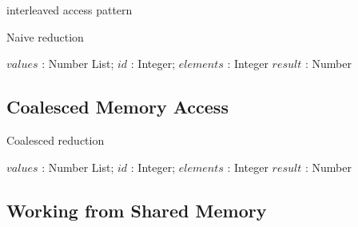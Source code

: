 interleaved access pattern


\begin{algorithm}
  \caption{Naive reduction}
  \label{alg:naiveReduct}
  \begin{algorithmic}
              {$values$ : Number List; $id$ : Integer; $elements$ : Integer}
              {$result$ : Number}
              {
                  \ENDIF
                  \SYNC
                \ENDWHILE
                \ENDIF
              }
  \end{algorithmic}
\end{algorithm}


\subsection{Coalesced Memory Access}

\begin{algorithm}
  \caption{Coalesced reduction}
  \label{alg:coalescedReduct}
  \begin{algorithmic}
              {$values$ : Number List; $id$ : Integer; $elements$ : Integer}
              {$result$ : Number}
              {
                  \ENDIF
                  \SYNC
                \ENDWHILE
                \ENDIF
              }
  \end{algorithmic}
\end{algorithm}


\subsection{Working from Shared Memory}


